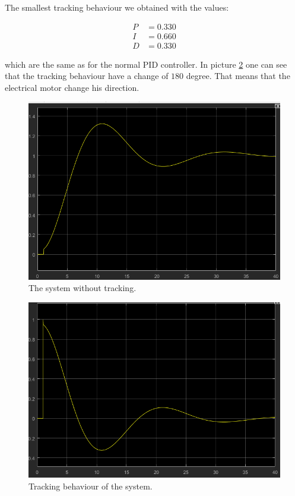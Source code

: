 The smallest tracking behaviour we obtained with the values:

\begin{align*}
    P &= 0.330 \\
    I &= 0.660 \\
    D &= 0.330
\end{align*}

which  are  the  same  as  for  the  normal   PID   controller.   In   picture
\ref{fig:tracking}  one  can  see  that the tracking behaviour have a change of
$180$  degree.  That means that the electrical  motor  change  his  direction.

\begin{figure}[t]
    \centering
    \includegraphics[width=\imagewidth]{images/slope.png}
    \caption{The system without tracking.}
    \label{fig:WithoutTracking}
\end{figure}

\begin{figure}[t]
    \centering
    \includegraphics[width=\imagewidth]{images/slope_tracking.png}
    \caption{Tracking behaviour of the system.}
    \label{fig:tracking}
\end{figure}

\clearpage
